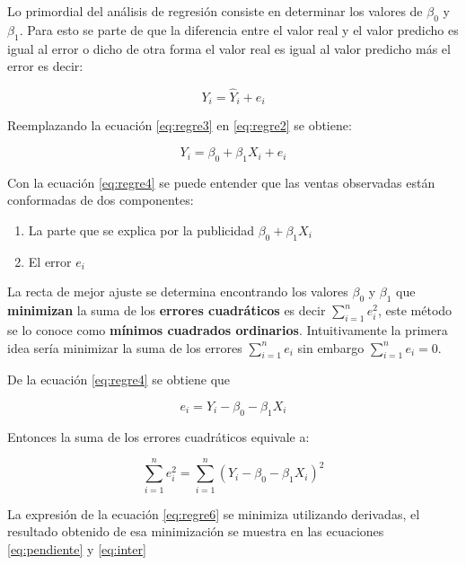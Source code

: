 \documentclass[]{book}
\providecommand{\tightlist}{%
  \setlength{\itemsep}{0pt}\setlength{\parskip}{0pt}}
\begin{document}
Lo primordial del análisis de regresión consiste en determinar los valores de \(\beta_0\) y \(\beta_1\). Para esto se parte de que la diferencia entre el valor real y el valor predicho es igual al error o dicho de otra forma el valor real es igual al valor predicho más el error es decir:

\begin{equation}
Y_i=\hat{Y}_i+e_i 
    \label{eq:regre3}
\end{equation}

Reemplazando la ecuación \eqref{eq:regre3} en \eqref{eq:regre2} se obtiene:

\begin{equation}
Y_i=\beta_0 + \beta_1 X_i+e_i 
    \label{eq:regre4}
\end{equation}

Con la ecuación \eqref{eq:regre4} se puede entender que las ventas observadas están conformadas de dos componentes:

\begin{enumerate}
\def\labelenumi{\arabic{enumi}.}
\tightlist
\item
  La parte que se explica por la publicidad \(\beta_0 + \beta_1 X_i\)
\item
  El error \(e_i\)
\end{enumerate}

La recta de mejor ajuste se determina encontrando los valores \(\beta_0\) y \(\beta_1\) que \textbf{minimizan} la suma de los \textbf{errores cuadráticos} es decir \(\sum_{i=1}^{n}{e_i^2}\), este método se lo conoce como \textbf{mínimos cuadrados ordinarios}. Intuitivamente la primera idea sería minimizar la suma de los errores \(\sum_{i=1}^{n}{e_i}\) sin embargo \(\sum_{i=1}^{n}{e_i}=0\).

De la ecuación \eqref{eq:regre4} se obtiene que

\begin{equation}
e_i = Y_i-\beta_0 - \beta_1 X_i
    \label{eq:regre5}
\end{equation}

Entonces la suma de los errores cuadráticos equivale a:

\begin{equation}
\sum_{i=1}^{n}{e_i^2} = \sum_{i=1}^{n}{\left(Y_i-\beta_0 - \beta_1 X_i\right)^2}
    \label{eq:regre6}
\end{equation}

La expresión de la ecuación \eqref{eq:regre6} se minimiza utilizando derivadas, el resultado obtenido de esa minimización se muestra en las ecuaciones \eqref{eq:pendiente} y \eqref{eq:inter}
\end{document}
